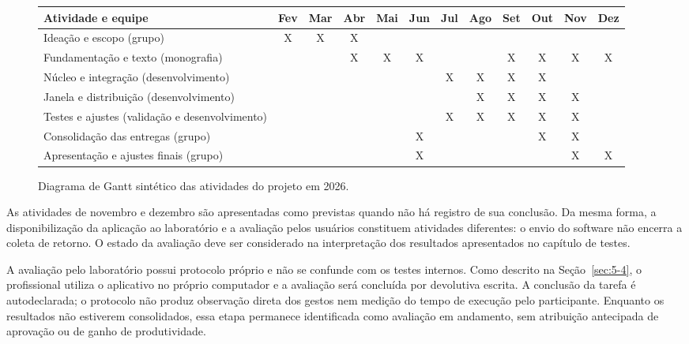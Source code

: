 \begin{figure}[htbp]
\centering
\caption{Diagrama de Gantt sintético das atividades do projeto em 2026.}
\label{fig:4-gantt}
\begingroup
\scriptsize
\setlength{\tabcolsep}{2pt}
\begin{tabularx}{\textwidth}{|X|*{11}{c|}}
\hline
\textbf{Atividade e equipe} & Fev & Mar & Abr & Mai & Jun & Jul & Ago & Set & Out & Nov & Dez \\ \hline
Ideação e escopo (grupo) & X & X & X & & & & & & & & \\ \hline
Fundamentação e texto (monografia) & & & X & X & X & & & X & X & X & X \\ \hline
Núcleo e integração (desenvolvimento) & & & & & & X & X & X & X & & \\ \hline
Janela e distribuição (desenvolvimento) & & & & & & & X & X & X & X & \\ \hline
Testes e ajustes (validação e desenvolvimento) & & & & & & X & X & X & X & X & \\ \hline
Consolidação das entregas (grupo) & & & & & X & & & & X & X & \\ \hline
Apresentação e ajustes finais (grupo) & & & & & X & & & & & X & X \\ \hline
\end{tabularx}
\endgroup
\par{}
\end{figure}

As atividades de novembro e dezembro são apresentadas como previstas quando não há registro de sua conclusão. Da mesma forma, a disponibilização da aplicação ao laboratório e a avaliação pelos usuários constituem atividades diferentes: o envio do software não encerra a coleta de retorno. O estado da avaliação deve ser considerado na interpretação dos resultados apresentados no capítulo de testes.

A avaliação pelo laboratório possui protocolo próprio e não se confunde com os testes internos. Como descrito na Seção~\ref{sec:5-4}, o profissional utiliza o aplicativo no próprio computador e a avaliação será concluída por devolutiva escrita. A conclusão da tarefa é autodeclarada; o protocolo não produz observação direta dos gestos nem medição do tempo de execução pelo participante. Enquanto os resultados não estiverem consolidados, essa etapa permanece identificada como avaliação em andamento, sem atribuição antecipada de aprovação ou de ganho de produtividade.

